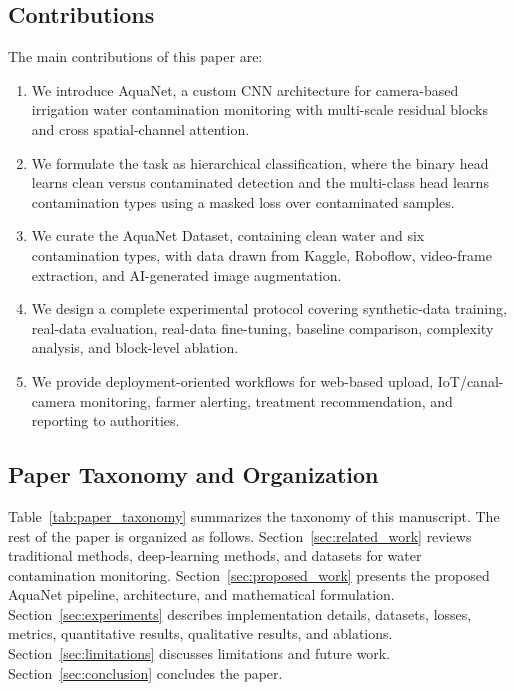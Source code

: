 \documentclass[journal]{IEEEtran}
\newcommand{\method}{AquaNet}
\newcommand{\dataset}{AquaNet Dataset}
\begin{document}
\subsection{Contributions}
\label{subsec:contributions}
The main contributions of this paper are:
\begin{enumerate}
    \item We introduce \method{}, a custom CNN architecture for camera-based irrigation water contamination monitoring with multi-scale residual blocks and cross spatial-channel attention.
    \item We formulate the task as hierarchical classification, where the binary head learns clean versus contaminated detection and the multi-class head learns contamination types using a masked loss over contaminated samples.
    \item We curate the \dataset{}, containing clean water and six contamination types, with data drawn from Kaggle, Roboflow, video-frame extraction, and AI-generated image augmentation.
    \item We design a complete experimental protocol covering synthetic-data training, real-data evaluation, real-data fine-tuning, baseline comparison, complexity analysis, and block-level ablation.
    \item We provide deployment-oriented workflows for web-based upload, IoT/canal-camera monitoring, farmer alerting, treatment recommendation, and reporting to authorities.
\end{enumerate}

\subsection{Paper Taxonomy and Organization}
\label{subsec:taxonomy}
Table~\ref{tab:paper_taxonomy} summarizes the taxonomy of this manuscript. The rest of the paper is organized as follows. Section~\ref{sec:related_work} reviews traditional methods, deep-learning methods, and datasets for water contamination monitoring. Section~\ref{sec:proposed_work} presents the proposed \method{} pipeline, architecture, and mathematical formulation. Section~\ref{sec:experiments} describes implementation details, datasets, losses, metrics, quantitative results, qualitative results, and ablations. Section~\ref{sec:limitations} discusses limitations and future work. Section~\ref{sec:conclusion} concludes the paper.
\end{document}
